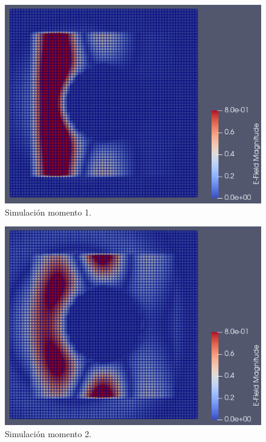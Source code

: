 \documentclass[
    11pt,
    spanish,
	a4paper
]{article}
\begin{document}
\begin{figure}[htbp]
	\centering
	\includegraphics[width=\textwidth]{./img/impacto.png}
	\caption{Simulación momento 1.}
	\label{fig:sim4}
\end{figure}

\begin{figure}[htbp]
	\centering
	\includegraphics[width=\textwidth]{./img/mitad.png}
	\caption{Simulación momento 2.}
	\label{fig:sim5}
\end{figure}
\end{document}
